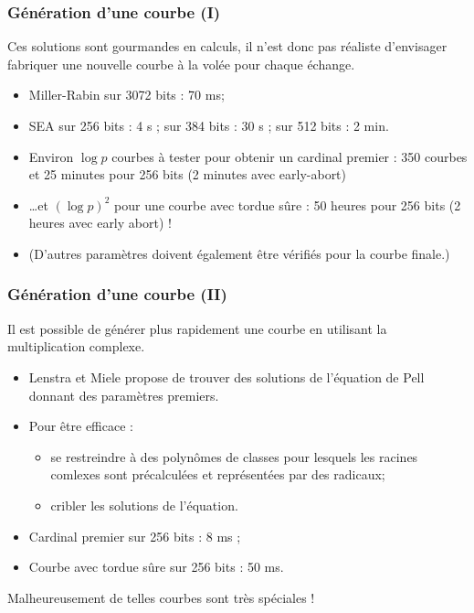 \documentclass[francais]{beamer}
\begin{document}
\begin{frame}\frametitle{Génération d'une courbe (I)}
\begin{block}{}
Ces solutions sont gourmandes en calculs,
il n'est donc pas réaliste d'envisager
fabriquer une nouvelle courbe à la volée pour chaque échange.
\end{block}

\begin{itemize}
\item Miller-Rabin sur 3072 bits : 70 ms;
\item SEA sur 256 bits : 4 s ; sur 384 bits : 30 s ; sur 512 bits : 2 min.
\item Environ $\log p$ courbes à tester pour obtenir un cardinal premier : 350 courbes et 25 minutes pour 256 bits (2 minutes avec early-abort)
\item \ldots et $(\log p)^2$ pour une courbe avec tordue sûre : 50 heures pour 256 bits (2 heures avec early abort) !
\item (D'autres paramètres doivent également être vérifiés pour la courbe finale.)
\end{itemize}
\end{frame}

\begin{frame}\frametitle{Génération d'une courbe (II)}
\begin{block}{}
Il est possible de générer plus rapidement une courbe en utilisant la multiplication complexe.
\end{block}

\begin{itemize}
\item Lenstra et Miele propose de trouver des solutions de l'équation de Pell donnant des paramètres premiers.
\item Pour être efficace :
\begin{itemize}
\item se restreindre à des polynômes de classes pour lesquels les racines comlexes sont précalculées et représentées par des radicaux;
\item cribler les solutions de l'équation.
\end{itemize}
\end{itemize}
\begin{block}{}
\begin{itemize}
\item Cardinal premier sur 256 bits : 8 ms ;
\item Courbe avec tordue sûre sur 256 bits : 50 ms.
\end{itemize}
\end{block}
Malheureusement de telles courbes sont très spéciales !
\end{frame}
\end{document}
